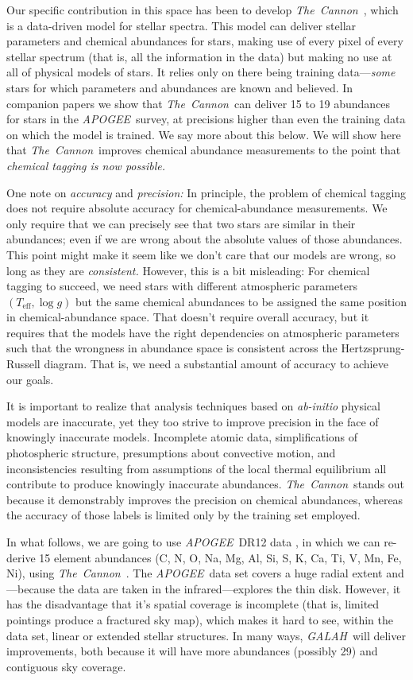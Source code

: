 \documentclass[12pt, letterpaper, preprint]{aastex}
\newcommand{\acronym}[1]{{\small{#1}}}
\newcommand{\project}[1]{\textsl{#1}}
\newcommand{\apogee}{\project{\acronym{APOGEE}}}
\newcommand{\galah}{\project{\acronym{GALAH}}}
\newcommand{\thecannon}{\project{The~Cannon}}
\newcommand{\foreign}[1]{\textsl{#1}}
\newcommand{\teff}{T_{\mathrm{eff}}}
\newcommand{\logg}{\log g}
\begin{document}
Our specific contribution in this space has been to develop
\thecannon\ \citep{thecannon, ages}, which is a data-driven model for
stellar spectra.
This model can deliver stellar parameters and chemical abundances for
stars, making use of every pixel of every stellar spectrum (that is,
all the information in the data) but making no use at all of physical
models of stars.
It relies only on there being training data---\emph{some} stars for
which parameters and abundances are known and believed.
In companion papers \citep{casey16, ness16} we show that
\thecannon\ can deliver 15 to 19 abundances for stars in the
\apogee\ survey, at precisions higher than even the training data on
which the model is trained.
We say more about this below.
We will show here that \thecannon\ improves chemical abundance measurements
to the point that \emph{chemical tagging is now possible.}

One note on \emph{accuracy} and \emph{precision:}
In principle, the problem of chemical tagging does not require
absolute accuracy for chemical-abundance measurements.
We only require that we can precisely see that two stars are similar
in their abundances; even if we are wrong about the absolute values of
those abundances.
This point might make it seem like we don't care that our models are
wrong, so long as they are \emph{consistent.}
However, this is a bit misleading:
For chemical tagging to succeed, we need stars with different
atmospheric parameters $(\teff, \logg)$ but the same chemical
abundances to be assigned the same position in chemical-abundance
space.
That doesn't require overall accuracy, but it requires that the models
have the right dependencies on atmospheric parameters such that the
wrongness in abundance space is consistent across the Hertzsprung-Russell diagram.
That is, we need a substantial amount of accuracy to achieve our goals.

It is important to realize that analysis techniques based on \foreign{ab-initio}
physical models are inaccurate, yet they too strive to improve precision
in the face of knowingly inaccurate models.  Incomplete atomic data, 
simplifications of photospheric structure, presumptions about convective
motion, and inconsistencies resulting from assumptions of the local thermal
equilibrium all contribute to produce knowingly inaccurate abundances.
\thecannon\ stands out because it demonstrably improves the precision on
chemical abundances, whereas the accuracy of those labels is limited only
by the training set employed.

In what follows, we are going to use \apogee\ \acronym{DR12} data \citep{dr12}, in
which we can re-derive 15 element abundances (C, N, O, Na, Mg, Al, Si,
S, K, Ca, Ti, V, Mn, Fe, Ni), using \thecannon\ \citep{thecannon}.
The \apogee\ data set covers a huge radial extent and---because the
data are taken in the infrared---explores the thin disk.
However, it has the disadvantage that it's spatial coverage is incomplete
(that is, limited pointings produce a fractured sky map),
which makes it hard to see, within the data set, linear or
extended stellar structures.
In many ways, \galah\ will deliver improvements, both because it will
have more abundances (possibly 29) and contiguous sky coverage.
\end{document}

